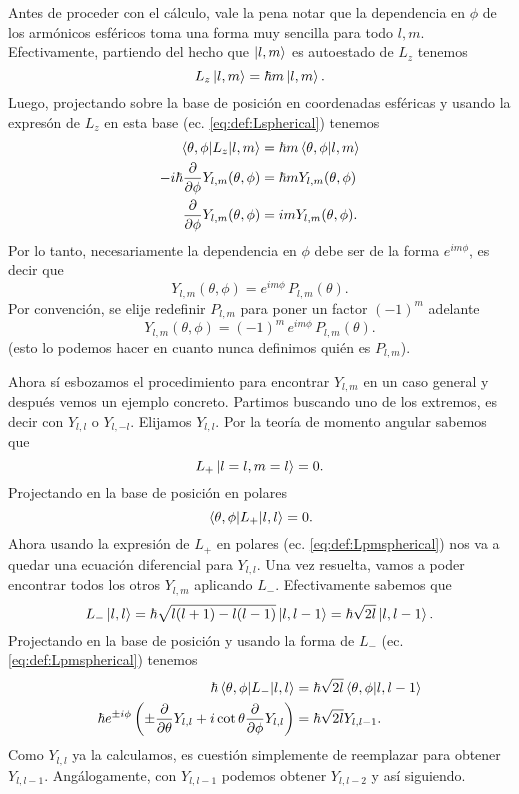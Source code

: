 \documentclass[10pt, a4paper]{article}
\newcommand{\Ylm}{Y_{l,m}}
\newcommand{\Ylmev}[2]{Y_{#1,#2}}
\newcommand{\Plm}{P_{l,m}}
\numberwithin{equation}{subsection}
\begin{document}
Antes de proceder con el cálculo, vale la pena notar que la dependencia en
$\phi$ de los armónicos esféricos toma una forma muy sencilla para todo $l,m$.
Efectivamente, partiendo del hecho que $\ket{l,m}$ es autoestado de $L_z$
tenemos
\begin{equation}
  L_z\ket{l,m} = \hbar m\ket{l,m}.
\end{equation}
Luego, projectando sobre la base de posición en coordenadas esféricas y usando
la expresón de $L_z$ en esta base (ec. \eqref{eq:def:Lspherical}) tenemos
\begin{align}
  \matrixel{\theta,\phi}{L_z}{l,m} &= \hbar m\braket{\theta,\phi}{l,m} \\
  -i\hbar\pdv{\phi}\Ylm(\theta,\phi) &= \hbar m \Ylm(\theta,\phi) \\
  \pdv{\phi}\Ylm(\theta,\phi) &= im \Ylm(\theta,\phi).
\end{align}
Por lo tanto, necesariamente la dependencia en $\phi$ debe ser de la forma
$e^{im\phi}$, es decir que
\begin{equation}
  \Ylm(\theta,\phi) = e^{im\phi}\,\Plm(\theta).
\end{equation}
Por convención, se elije redefinir $\Plm$ para poner un factor $(-1)^m$
adelante
\begin{equation} \label{eq:def:YlmPlm}
  \Ylm(\theta,\phi) = (-1)^m\,e^{im\phi}\,\Plm(\theta).
\end{equation}
(esto lo podemos hacer en cuanto nunca definimos quién es $\Plm$).

\bigbreak

Ahora sí esbozamos el procedimiento para encontrar $\Ylm$ en un caso general y
después vemos un ejemplo concreto. Partimos buscando uno de los extremos, es
decir con $\Ylmev{l}{l}$ o $\Ylmev{l}{-l}$. Elijamos $\Ylmev{l}{l}$. Por la
teoría de momento angular sabemos que
\begin{equation}
  L_+\ket{l = {l}, m = {l}} = 0.
\end{equation}
Projectando en la base de posición en polares
\begin{equation}
  \matrixel{\theta,\phi}{L_+}{l,l} = 0.
\end{equation}
Ahora usando la expresión de $L_+$ en polares (ec. \eqref{eq:def:Lpmspherical})
nos va a quedar una ecuación diferencial para $\Ylmev{l}{l}$. Una vez resuelta,
vamos a poder encontrar todos los otros $\Ylm$ aplicando $L_-$. Efectivamente
sabemos que
\begin{equation}
  L_-\ket{l,l} = \hbar\sqrt{l(l+1) - l(l-1)}\ket{l,l-1} =
    \hbar\sqrt{2l}\ket{l,l-1}.
\end{equation}
Projectando en la base de posición y usando la forma de $L_-$ (ec.
\eqref{eq:def:Lpmspherical}) tenemos
\begin{align}
  \hbar\matrixel{\theta,\phi}{L_-}{l,l} &=
    \hbar\sqrt{2l}\braket{\theta,\phi}{l,l-1} \\
  \hbar e^{\pm i\phi}\left(\pm\pdv{\theta}\Ylmev{l}{l} +
    i\cot\theta\pdv{\phi}\Ylmev{l}{l}\right)
   &=
    \hbar\sqrt{2l}\Ylmev{l}{l-1}.
\end{align}
Como $\Ylmev{l}{l}$ ya la calculamos, es cuestión simplemente de reemplazar
para obtener $\Ylmev{l}{l-1}$. Angálogamente, con $\Ylmev{l}{l-1}$ podemos
obtener $\Ylmev{l}{l-2}$ y así siguiendo.
\end{document}

